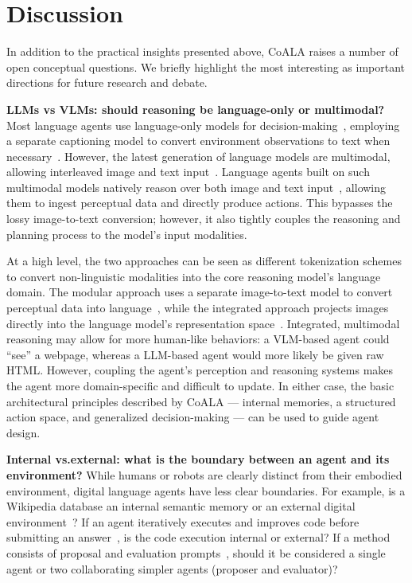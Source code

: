 \documentclass[10pt]{article} %
\begin{document}
\section{Discussion}
\label{sec:questions}
In addition to the practical insights presented above, CoALA raises a number of open conceptual questions. We briefly highlight the most interesting as important directions for future research and debate.

\textbf{LLMs vs VLMs: should reasoning be language-only or multimodal?} Most language agents use language-only models for decision-making~\citep{yao2022react, wang2023voyager, yao2023tree}, employing a separate captioning model to convert environment observations to text when necessary~\citep{ahn2022can, zeng2022socratic}. However, the latest generation of language models are multimodal, allowing interleaved image and text input~\citep{OpenAI2023GPT4TR, alayrac2022flamingo, team2023gemini, li2023multimodal}. Language agents built on such multimodal models natively reason over both image and text input~\citep{fuyu-8b, persimmon-8b, liu2023llava, hong2023cogagent, driess2023palm}, allowing them to ingest perceptual data and directly produce actions. This bypasses the lossy image-to-text conversion; however, it also tightly couples the reasoning and planning process to the model's input modalities.

At a high level, the two approaches can be seen as different tokenization schemes to convert non-linguistic modalities into the core reasoning model's language domain. The modular approach uses a separate image-to-text model to convert perceptual data into language~\citep{ahn2022can, zeng2022socratic}, while the integrated approach projects images directly into the language model's representation space~\citep{fuyu-8b, persimmon-8b, liu2023llava}. Integrated, multimodal reasoning may allow for more human-like behaviors: a VLM-based agent could ``see'' a webpage, whereas a LLM-based agent would more likely be given raw HTML. However, coupling the agent's perception and reasoning systems makes the agent more domain-specific and difficult to update. In either case, the basic architectural principles described by CoALA --- internal memories, a structured action space, and generalized decision-making --- can be used to guide agent design.



\textbf{Internal vs.\;external: what is the boundary between an agent and its environment?} While humans or robots are clearly distinct from their embodied environment, digital language agents have less clear boundaries. For example, is a Wikipedia database an internal semantic memory or an external digital environment~\citep{yao2022react}? If an agent iteratively executes and improves code before submitting an answer~\citep{shinn2023reflexion, yang2023intercode}, is the code execution internal or external? If a method consists of proposal and evaluation prompts~\citep{yao2023tree}, should it be considered a single agent or two collaborating simpler agents (proposer and evaluator)? 
\end{document}
